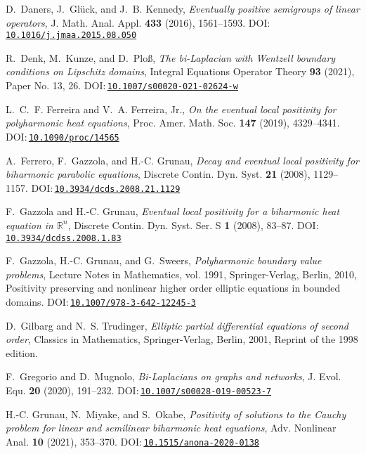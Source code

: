 \documentclass[a4paper, reqno,titlepage]{amsart}
\numberwithin{equation}{section}
\theoremstyle{plain}
\theoremstyle{definition}
\theoremstyle{remark}
\begin{document}
\begin{thebibliography}{10}
D.~Daners, J.~Gl\"{u}ck, and J.~B. Kennedy, \emph{Eventually positive
  semigroups of linear operators}, J. Math. Anal. Appl. \textbf{433} (2016),
  1561--1593.
  DOI:\,\href{https://doi.org/10.1016/j.jmaa.2015.08.050}{\nolinkurl{10.1016/j.jmaa.2015.08.050}}

R.~Denk, M.~Kunze, and D.~Plo\ss, \emph{The bi-{L}aplacian with {W}entzell
  boundary conditions on {L}ipschitz domains}, Integral Equations Operator
  Theory \textbf{93} (2021), Paper No. 13, 26.
  DOI:\,\href{https://doi.org/10.1007/s00020-021-02624-w}{\nolinkurl{10.1007/s00020-021-02624-w}}

L.~C.~F. Ferreira and V.~A. Ferreira, Jr., \emph{On the eventual local
  positivity for polyharmonic heat equations}, Proc. Amer. Math. Soc.
  \textbf{147} (2019), 4329--4341.
  DOI:\,\href{https://doi.org/10.1090/proc/14565}{\nolinkurl{10.1090/proc/14565}}

A.~Ferrero, F.~Gazzola, and H.-C. Grunau, \emph{Decay and eventual local
  positivity for biharmonic parabolic equations}, Discrete Contin. Dyn. Syst.
  \textbf{21} (2008), 1129--1157.
  DOI:\,\href{https://doi.org/10.3934/dcds.2008.21.1129}{\nolinkurl{10.3934/dcds.2008.21.1129}}

F.~Gazzola and H.-C. Grunau, \emph{Eventual local positivity for a biharmonic
  heat equation in {$\mathbb{R}^n$}}, Discrete Contin. Dyn. Syst. Ser. S
  \textbf{1} (2008), 83--87.
  DOI:\,\href{https://doi.org/10.3934/dcdss.2008.1.83}{\nolinkurl{10.3934/dcdss.2008.1.83}}

F.~Gazzola, H.-C. Grunau, and G.~Sweers, \emph{Polyharmonic boundary value
  problems}, Lecture Notes in Mathematics, vol. 1991, Springer-Verlag, Berlin,
  2010, Positivity preserving and nonlinear higher order elliptic equations in
  bounded domains.
  DOI:\,\href{https://doi.org/10.1007/978-3-642-12245-3}{\nolinkurl{10.1007/978-3-642-12245-3}}

D.~Gilbarg and N.~S. Trudinger, \emph{Elliptic partial differential equations
  of second order}, Classics in Mathematics, Springer-Verlag, Berlin, 2001,
  Reprint of the 1998 edition.

F.~Gregorio and D.~Mugnolo, \emph{Bi-{L}aplacians on graphs and networks}, J.
  Evol. Equ. \textbf{20} (2020), 191--232.
  DOI:\,\href{https://doi.org/10.1007/s00028-019-00523-7}{\nolinkurl{10.1007/s00028-019-00523-7}}

H.-C. Grunau, N.~Miyake, and S.~Okabe, \emph{Positivity of solutions to the
  {C}auchy problem for linear and semilinear biharmonic heat equations}, Adv.
  Nonlinear Anal. \textbf{10} (2021), 353--370.
  DOI:\,\href{https://doi.org/10.1515/anona-2020-0138}{\nolinkurl{10.1515/anona-2020-0138}}


\end{thebibliography}
\end{document}
